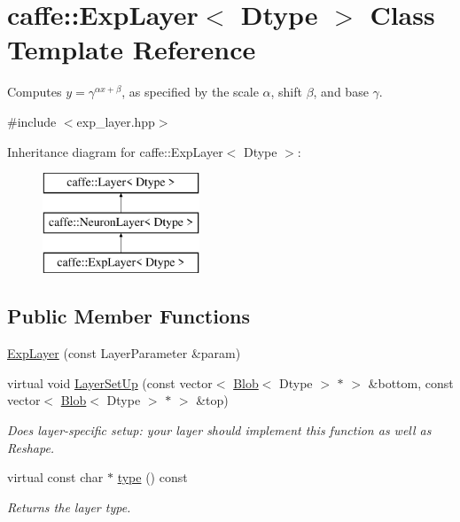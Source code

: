 \hypertarget{classcaffe_1_1ExpLayer}{}\section{caffe\+:\+:Exp\+Layer$<$ Dtype $>$ Class Template Reference}
\label{classcaffe_1_1ExpLayer}


Computes $ y = \gamma ^ {\alpha x + \beta} $, as specified by the scale $ \alpha $, shift $ \beta $, and base $ \gamma $.  




{\ttfamily \#include $<$exp\+\_\+layer.\+hpp$>$}

Inheritance diagram for caffe\+:\+:Exp\+Layer$<$ Dtype $>$\+:\begin{figure}[H]
\begin{center}
\leavevmode
\includegraphics[height=3.000000cm]{classcaffe_1_1ExpLayer}
\end{center}
\end{figure}
\subsection*{Public Member Functions}
\begin{DoxyCompactItemize}
\item 
\hyperlink{classcaffe_1_1ExpLayer_a87a0fae261ad3d2c8947f463686a6de0}{Exp\+Layer} (const Layer\+Parameter \&param)
\item 
virtual void \hyperlink{classcaffe_1_1ExpLayer_a5f88102bf4922032eeab431154a76710}{Layer\+Set\+Up} (const vector$<$ \hyperlink{classcaffe_1_1Blob}{Blob}$<$ Dtype $>$ $\ast$ $>$ \&bottom, const vector$<$ \hyperlink{classcaffe_1_1Blob}{Blob}$<$ Dtype $>$ $\ast$ $>$ \&top)
\begin{DoxyCompactList}\small\item\em Does layer-\/specific setup\+: your layer should implement this function as well as Reshape. \end{DoxyCompactList}\item 
virtual const char $\ast$ \hyperlink{classcaffe_1_1ExpLayer_a9fce31193341c4f70a65a8670121ab51}{type} () const \hypertarget{classcaffe_1_1ExpLayer_a9fce31193341c4f70a65a8670121ab51}{}\label{classcaffe_1_1ExpLayer_a9fce31193341c4f70a65a8670121ab51}

\begin{DoxyCompactList}\small\item\em Returns the layer type. \end{DoxyCompactList}\end{DoxyCompactItemize}
